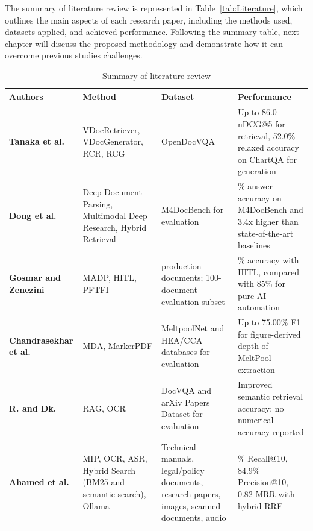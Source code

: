 \documentclass[11pt,a4paper]{report}
\begin{document}
The summary of literature review is represented in Table~\ref{tab:Literature}, which outlines the main aspects of each research paper, including the methods used, datasets applied, and achieved performance. Following the summary table, next chapter will discuss the proposed methodology and demonstrate how it can overcome previous studies challenges.

\begin{table}[h]
    \centering
    \caption{Summary of literature review}
    \begin{tabular}{|>{\raggedright\arraybackslash}p{}|>{\raggedright\arraybackslash}p{}|>{\raggedright\arraybackslash}p{}|>{\raggedright\arraybackslash}p{}|}
        \hline
        \textbf{Authors} & \textbf{Method} & \textbf{Dataset} & \textbf{Performance} \\
        \hline
        \textbf{Tanaka et al.} &
        VDocRetriever, VDocGenerator, \ac{RCR}, \ac{RCG} &
        OpenDocVQA &
        Up to 86.0 \ac{nDCG@5} for retrieval, 52.0\% relaxed accuracy on ChartQA for generation \\
        \hline
        \textbf{Dong et al.} &
        Deep Document Parsing, Multimodal Deep Research, Hybrid Retrieval &
        M4DocBench for evaluation &
        50.6\% answer accuracy on M4DocBench and 3.4x higher than state-of-the-art baselines \\
        \hline
        \textbf{Gosmar and Zenezini} &
        MADP, \ac{HITL}, \ac{PFTFI} &
        955 production documents; 100-document evaluation subset &
        98.5\% accuracy with \ac{HITL}, compared with 85\% for pure \ac{AI} automation \\
        \hline
        \textbf{Chandrasekhar et al.} &
        \ac{MDA}, Marker\ac{PDF} &
        MeltpoolNet and \ac{HEA}/\ac{CCA} databases for evaluation &
        Up to 75.00\% F1 for figure-derived depth-of-MeltPool extraction \\
        \hline
        \textbf{R. and Dk.} &
        \ac{RAG}, \ac{OCR} &
        DocVQA and arXiv Papers Dataset for evaluation &
        Improved semantic retrieval accuracy; no numerical accuracy reported \\
        \hline
        \textbf{Ahamed et al.} &
        \ac{MIP}, \ac{OCR}, \ac{ASR}, Hybrid Search (\ac{BM25} and semantic search), Ollama &
        Technical manuals, legal/policy documents, research papers, images, scanned documents, audio &
        87.4\% Recall@10, 84.9\% Precision@10, 0.82 MRR with hybrid \ac{RRF} \\

\end{tabular}
\end{table}
\end{document}
